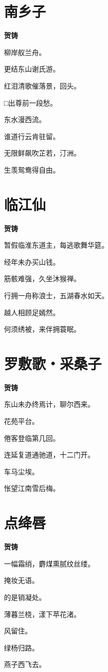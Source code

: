 \documentclass[12pt,a4paper]{ctexbook}
\begin{document}
\section{南乡子}
\textbf{贺铸}\par\vspace{0.5em}
柳岸舣兰舟。\par
更结东山谢氏游。\par
红泪清歌催落景，回头。\par
□出尊前一段愁。\par
东水漫西流。\par
谁道行云肯驻留。\par
无限鲜飙吹芷若，汀洲。\par
生羡鸳鸯得自由。\par

\section{临江仙}
\textbf{贺铸}\par\vspace{0.5em}
暂假临淮东道主，每逃歌舞华筵。\par
经年未办买山钱。\par
筋骸难强，久坐沐猴禅。\par
行拥一舟称浪士，五湖春水如天。\par
越人相顾足嫣然。\par
何须绣被，来伴拥蓑眠。\par

\section{罗敷歌・采桑子}
\textbf{贺铸}\par\vspace{0.5em}
东山未办终焉计，聊尔西来。\par
花苑平台。\par
倦客登临第几回。\par
连延复道通驰道，十二门开。\par
车马尘埃。\par
怅望江南雪后梅。\par

\section{点绛唇}
\textbf{贺铸}\par\vspace{0.5em}
一幅霜绡，麝煤熏腻纹丝缕。\par
掩妆无语。\par
的是销凝处。\par
薄暮兰桡，漾下苹花渚。\par
风留住。\par
绿杨归路。\par
燕子西飞去。\par
\end{document}
